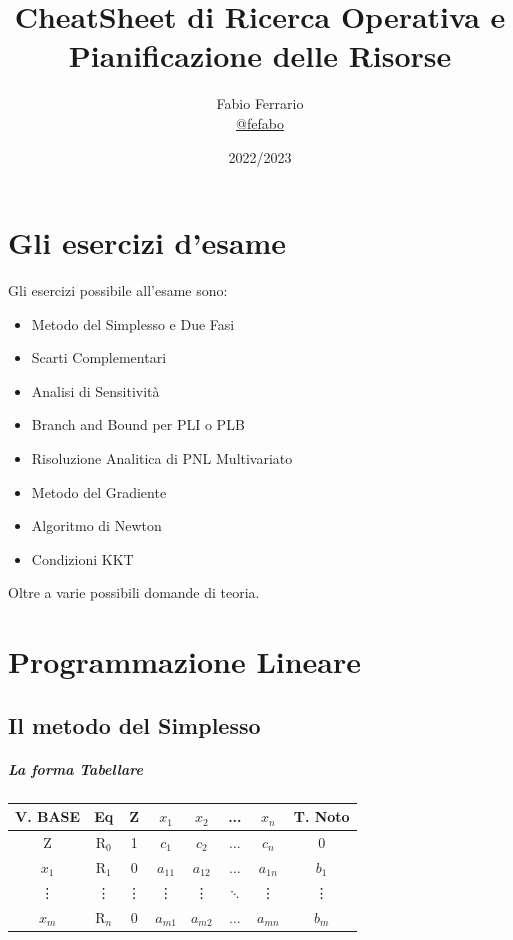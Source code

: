 \documentclass[12pt, a4paper, openany]{book}
\begin{document}
\title{CheatSheet di Ricerca Operativa e Pianificazione delle Risorse}

\author{
	Fabio Ferrario\\
	\small{\href{https://t.me/fefabo}{@fefabo}}
}
\date{2022/2023}

\maketitle

\tableofcontents
\chapter{Gli esercizi d'esame}
Gli esercizi possibile all'esame sono:
\begin{itemize}
	\item Metodo del Simplesso e Due Fasi
	\item Scarti Complementari
	\item Analisi di Sensitività
	\item Branch and Bound per PLI o PLB
	\item Risoluzione Analitica di PNL Multivariato
	\item Metodo del Gradiente
	\item Algoritmo di Newton
	\item Condizioni KKT
\end{itemize}

Oltre a varie possibili domande di teoria.

\chapter{Programmazione Lineare}
\section{Il metodo del Simplesso}

\paragraph*{La forma Tabellare}
\begin{center}
	\begin{tabular}{c|c|c|cccc|c}
		\small{V. BASE} & Eq     & Z      & $x_1$    & $x_2$    & ...      & $x_n$    & T. Noto \\
		\hline
		Z               & R$_0$  & 1      & $c_1$    & $c_2$    & ...      & $c_n$    & 0       \\
		$x_1$           & R$_1$  & 0      & $a_{11}$ & $a_{12}$ & ...      & $a_{1n}$ & $b_1$   \\
		\vdots          & \vdots & \vdots & \vdots   & \vdots   & $\ddots$ & \vdots   & \vdots  \\
		$x_m$           & R$_n$  & 0      & $a_{m1}$ & $a_{m2}$ & ...      & $a_{mn}$ & $b_m$   \\
	\end{tabular}
\end{center}
\end{document}
